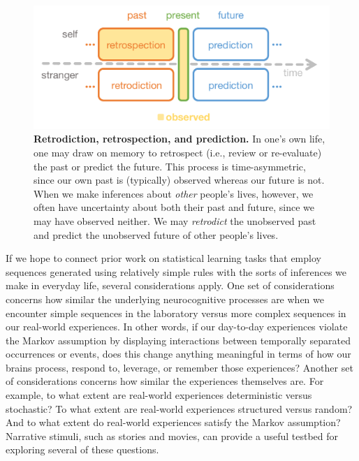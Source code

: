 \documentclass[10pt]{article}
\begin{document}
\begin{figure}[tp]
  \centering
  \includegraphics[width=\textwidth]{intro1}
  \caption{\textbf{Retrodiction, retrospection, and prediction.} In one's own life, one may draw on memory to retrospect (i.e., review or re-evaluate) the past or predict the future.  This process is time-asymmetric, since our own past is (typically) observed whereas our future is not.  When we make inferences about \textit{other} people's lives, however, we often have uncertainty about both their past and future, since we may have observed neither.  We may \textit{retrodict} the unobserved past and predict the unobserved future of other people's lives.}
  \label{fig:intro1}
\end{figure}

If we hope to connect prior work on statistical learning tasks that employ sequences generated using relatively simple rules with the sorts of inferences we make in everyday life, several considerations apply.  One set of considerations concerns how similar the underlying neurocognitive processes are when we encounter simple sequences in the laboratory versus more complex sequences in our real-world experiences.  In other words, if our day-to-day experiences violate the Markov assumption by displaying interactions between temporally separated occurrences or events, does this change anything meaningful in terms of how our brains process, respond to, leverage, or remember those experiences?  Another set of considerations concerns how similar the experiences themselves are.  For example, to what extent are real-world experiences deterministic versus stochastic?  To what extent are real-world experiences structured versus random?  And to what extent do real-world experiences satisfy the Markov assumption?  Narrative stimuli, such as stories and movies, can provide a useful testbed for exploring several of these questions.
\end{document}
